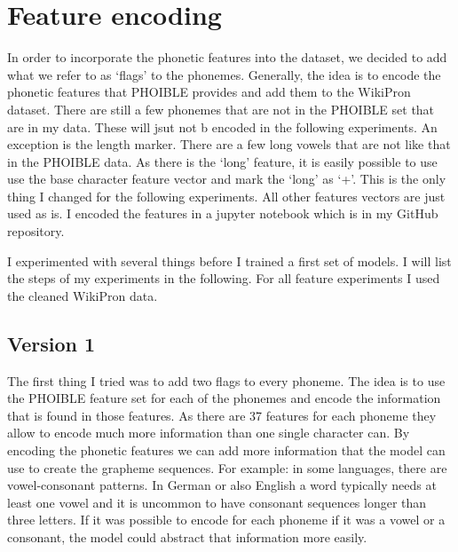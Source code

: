 \section{Feature encoding}
\label{sec:feature_enc}
In order to incorporate the phonetic features into the dataset, we decided to add what we refer to as `flags' to the phonemes. Generally, the idea is to encode the phonetic features that PHOIBLE provides and add them to the WikiPron dataset.  There are still a few phonemes that are not in the PHOIBLE set that are in my data. These will jsut not b encoded in the following experiments. An exception is the length marker. There are a few long vowels that are not like that in the PHOIBLE data. As there is the `long' feature, it is easily possible to use use the base character feature vector and mark the `long' as `+'. This is the only thing I changed for the following experiments. All other features vectors are just used as is. I encoded the features in a jupyter notebook which is in my GitHub repository.

I experimented with several things before I trained a first set of models. I will list the steps of my experiments in the following. For all feature experiments I used the cleaned WikiPron data.

\subsection*{Version 1}

The first thing I tried was to add two flags to every phoneme. The idea is to use the PHOIBLE feature set for each of the phonemes and encode the information that is found in those features. As there are 37 features for each phoneme they allow to encode much more information than one single character can. By encoding the phonetic features we can add more information that the model can use to create the grapheme sequences. For example: in some languages, there are vowel-consonant patterns. In German or also English a word typically needs at least one vowel and it is uncommon to have consonant sequences longer than three letters. If it was possible to encode for each phoneme if it was a vowel or a consonant, the model could abstract that information more easily. 

